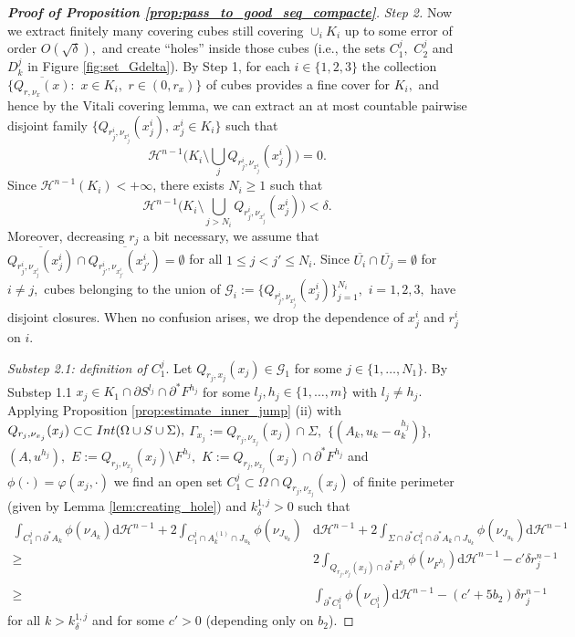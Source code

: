 \documentclass[reqno]{amsart}
\numberwithin{equation}{section}
\theoremstyle{plain}
\theoremstyle{definition}
\newcommand{\cH}{\mathcal{H}}
\newcommand{\cG}{\mathcal{G}}
\newcommand{\p}{\partial}
\newcommand{\cl}[1]{\overline{#1}}
\newcommand{\bound}{b}
\renewcommand{\d}{\mathrm{d}}
\newcommand{\strictlyincluded}{\subset\subset}
\newcommand{\substrate}{S}
\newcommand{\Ins}[1]{{\rm Int}{(#1\cup \substrate\cup \Sigma)}}
\begin{document}
\begin{proof}[\textbf{Proof of Proposition \ref{prop:pass_to_good_seq_compacte}}]
{\it Step 2.} Now we extract finitely many covering cubes still covering $\cup_iK_i$ up to some error of order $O(\sqrt\delta),$ and create ``holes'' inside those cubes (i.e., the sets $C_1^j,$ $C_2^j$ and $D_k^j$ in Figure \ref{fig:set_Gdelta}). By Step 1, for each $i\in \{1,2,3\}$ the collection $\{\cl{Q_{r,\nu_x}(x)}:\,\,x\in K_i,\,\, r\in(0,r_x)\}$ of cubes provides a fine cover for $K_i,$ and hence by the Vitali covering lemma, we can extract an at most countable pairwise disjoint family $\{Q_{r_j^i,\nu_{x_j^i}}(x_j^i),\,x_j^i\in K_i\}$ such that
$$
\cH^{n-1}\Big(K_i\setminus \bigcup_{j} Q_{r_j^i,\nu_{x_j^i}}(x_j^i)\Big)=0. 
$$
%
Since $\cH^{n-1}(K_i)<+\infty$,  there exists $N_i\ge1$ such that  
\begin{equation}\label{almost_cover_Ki}
\cH^{n-1}\Big(K_i\setminus \bigcup_{j > N_i} Q_{r_j^i,\nu_{x_j^i}}(x_j^i)\Big) < \delta.
\end{equation}
Moreover, decreasing $r_j$ a bit necessary, we assume that $\cl{Q_{r_j^i,\nu_{x_j^i}}(x_j^i)}\cap \cl{ Q_{r_{j'}^i,\nu_{x_{j'}^i}}(x_{j'}^i)}=\emptyset$ for all $1\le j< j' \le N_i.$ 
Since $\cl{U_i}\cap \cl{U_j} =\emptyset$ for $i\ne j,$ cubes belonging to the union of $\cG_i:=\{Q_{r_j^i,\nu_{x_j^i}}(x_j^i)\}_{j=1}^{N_i},$ $i=1,2,3,$ have disjoint closures. When no confusion arises, we drop the dependence of $x_j^i$ and $r_j^i$ on $i.$
\smallskip


{\it Substep 2.1: definition of $C_1^j.$} Let $Q_{r_j,x_j}(x_j) \in \cG_1$ for some $j\in\{1,\ldots,N_1\}.$ By Substep 1.1 $x_j\in K_1\cap \p S^{l_j}\cap \p^*F^{h_j}$ for some $l_j,h_j\in\{1,\ldots,m\}$ with $l_j\ne h_j.$ Applying
Proposition \ref{prop:estimate_inner_jump} (ii) with $Q_{r_j,\nu_{x_j}}(x_j)\strictlyincluded \Ins{\Omega},$ $\Gamma_{x_j}:=Q_{r_j,\nu_{x_j}}(x_j)\cap \Sigma,$ $\{(A_k,u_k-a_k^{h_j})\},$ $(A,u^{h_j}),$ $E:=Q_{r_j,\nu_{x_j}}(x_j)\setminus F^{h_j},$ $K:=Q_{r_j,\nu_{x_j}}(x_j)\cap \p^* F^{h_j}$ and $\phi(\cdot)=\varphi(x_j,\cdot)$ we find an open set $C_1^j\subset \Omega\cap Q_{r_j,\nu_{x_j}}(x_j)$ of finite perimeter (given by Lemma \ref{lem:creating_hole}) and $k_\delta^{1,j} > 0$ such that 
%
\begin{align}
\int_{C_1^j\cap\p^*A_k} \phi(\nu_{A_k})\d\cH^{n-1} +  2\int_{C_1^j \cap A_k^{(1)} \cap J_{u_k}}  \phi(\nu_{J_{u_k}}) &\d\cH^{n-1}   + 2 \int_{\Sigma\cap \p^* C_1^j \cap \p^*A_k \cap J_{u_k}} \phi(\nu_{J_{u_k}}) \d\cH^{n-1}\nonumber \\
\ge & 2\int_{Q_{r_j,\nu_j}(x_j)\cap \p^*F^{h_j}} \phi(\nu_{F^{h_j}})\d\cH^{n-1} - c'\delta r_j^{n-1}\nonumber \\
\ge & 
\int_{\p^* C_1^j} \phi(\nu_{C_1^j})\d\cH^{n-1} - (c' + 5\bound_2)\delta r_j^{n-1} \label{estimate_Cj1}
\end{align}
for all $k>k_\delta^{1,j}$ and for some $c'>0$ (depending only on $\bound_2$).


\end{proof}
\end{document}
